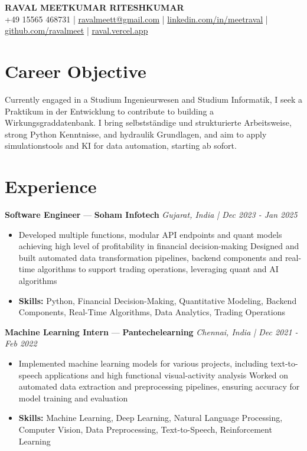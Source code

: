 \documentclass[a4paper,10pt]{article}
\begin{document}
\begin{center}
  {\Large\bfseries RAVAL MEETKUMAR RITESHKUMAR}\\[2pt]
  {\small +49 15565 468731 \;|\; \href{mailto:ravalmeett@gmail.com}{ravalmeett@gmail.com} \;|\; \href{https://www.linkedin.com/in/meetraval/}{linkedin.com/in/meetraval} \;|\; \href{https://github.com/ravalmeet}{github.com/ravalmeet} \;|\; \href{https://raval.vercel.app/}{raval.vercel.app}}
\end{center}
\vspace{-3pt}

\section*{Career Objective}
Currently engaged in a Studium Ingenieurwesen and Studium Informatik, I seek a Praktikum in der Entwicklung to contribute to building a Wirkungsgraddatenbank. I bring selbstständige und strukturierte Arbeitsweise, strong Python Kenntnisse, and hydraulik Grundlagen, and aim to apply simulationstools and KI for data automation, starting ab sofort.\par

\section*{Experience}
\textbf{Software Engineer} — \textbf{Soham Infotech} \hfill \textit{Gujarat, India \;|\; Dec 2023 - Jan 2025}\par
\vspace{1pt}
\begin{itemize}
  \item Developed multiple functions, modular API endpoints and quant models achieving high level of profitability in financial decision-making Designed and built automated data transformation pipelines, backend components and real-time algorithms to support trading operations, leveraging quant and AI algorithms
  \item \textbf{Skills:} Python, Financial Decision-Making, Quantitative Modeling, Backend Components, Real-Time Algorithms, Data Analytics, Trading Operations
\end{itemize}
\vspace{3pt}
\textbf{Machine Learning Intern} — \textbf{Pantechelearning} \hfill \textit{Chennai, India \;|\; Dec 2021 - Feb 2022}\par
\vspace{1pt}
\begin{itemize}
  \item Implemented machine learning models for various projects, including text-to-speech applications and high functional visual-activity analysis Worked on automated data extraction and preprocessing pipelines, ensuring accuracy for model training and evaluation
  \item \textbf{Skills:} Machine Learning, Deep Learning, Natural Language Processing, Computer Vision, Data Preprocessing, Text-to-Speech, Reinforcement Learning
\end{itemize}
\end{document}
